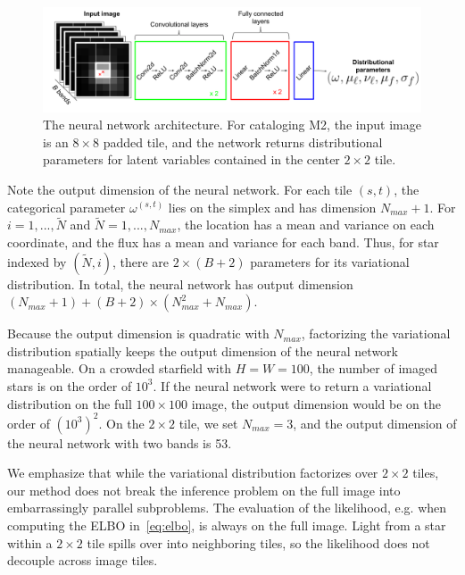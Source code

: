 \begin{figure}[!tb]
    \centering
    \includegraphics[width=\textwidth]{figures/starnet_archetecture4.png}
    \vspace{-0.5cm}
    \caption{The neural network architecture. For cataloging M2, the input image is an $8\times 8$ padded tile, and the network returns distributional parameters for latent variables contained in the center $2\times 2$ tile.\\
    }
    \label{fig:starnet_arch}
\end{figure}

Note the output dimension of the neural network. For each tile $(s,t)$, the categorical parameter $\omega^{(s,t)}$
lies on the simplex and has dimension $N_{max} + 1$. 
For $i = 1, ..., \tilde N$ and $\tilde N = 1, ..., N_{max}$, the location has a mean and variance on each coordinate, and the flux has a mean and variance for each band. Thus, for star indexed by $(\tilde N, i)$, 
there are $2 \times (B + 2)$ parameters for its variational distribution. In total, the neural network has output dimension $(N_{max} + 1) + (B + 2) \times (N_{max}^2 + N_{max})$. 


Because the output dimension is quadratic with $N_{max}$, factorizing the variational distribution spatially keeps the output dimension of the neural network manageable.
On a crowded starfield with $H = W = 100$, the number of imaged stars is on the order of $10^3$.
If the neural network were to return a variational distribution on the full $100\times 100$ image, the output dimension would be on the order of $(10^3)^2$. 
On the $2\times 2$ tile, we set $N_{max} = 3$, and the output dimension of the neural network with two bands is 53. 

We emphasize that while the variational distribution factorizes over $2 \times 2$ tiles, our method does not break the inference problem on the full image into embarrassingly parallel subproblems. The evaluation of the likelihood, e.g. when computing the ELBO in~\eqref{eq:elbo}, is always on the full image. Light from a star within a $2 \times 2$ tile spills over into neighboring tiles, so the likelihood does not decouple across image tiles. 
